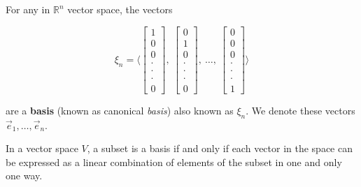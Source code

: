 \begin{tcolorbox}[colback=def_color,colframe=gray] \begin{definition}
For any in $\mathbb{R}^n$ vector space, the vectors 

$$\xi_n = \langle\begin{bmatrix} 1 \\ 0 \\ 0 \\ \cdot \\ \cdot \\ \cdot \\ 0\end{bmatrix}, \ \begin{bmatrix} 0 \\ 1 \\ 0 \\ \cdot \\ \cdot \\ \cdot \\ 0\end{bmatrix}, \ \dots, \ \begin{bmatrix} 0 \\ 0 \\ 0 \\ \cdot \\ \cdot \\ \cdot \\ 1\end{bmatrix}\rangle$$ 

are a \textbf{basis} (known as canonical \emph{basis}) also known as $\xi_n$. We denote these vectors $\vec{e}_1, \dots, \vec{e}_n$.
\end{definition}
\end{tcolorbox}

\begin{tcolorbox}[colback=def_color,colframe=gray,coltext=black] \begin{theorem}
In a vector space $V$, a subset is a basis if and only if each vector
in the space can be expressed as a linear combination of elements of the subset
in one and only one way.

\label{the:unique-lc-basis}
\end{theorem}
\end{tcolorbox}

